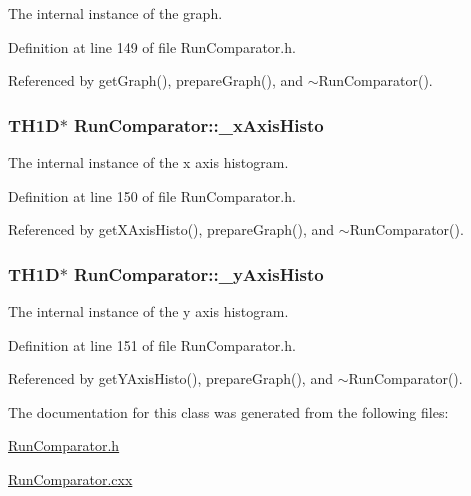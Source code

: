 The internal instance of the graph. 

Definition at line 149 of file RunComparator.h.

Referenced by getGraph(), prepareGraph(), and $\sim$RunComparator().\hypertarget{class_run_comparator_ab86d48424540d0f3f9abf52a2c11366b}{
\subsubsection[{\_\-xAxisHisto}]{\setlength{\rightskip}{0pt plus 5cm}TH1D$\ast$ {\bf RunComparator::\_\-xAxisHisto}}}
\label{class_run_comparator_ab86d48424540d0f3f9abf52a2c11366b}


The internal instance of the x axis histogram. 

Definition at line 150 of file RunComparator.h.

Referenced by getXAxisHisto(), prepareGraph(), and $\sim$RunComparator().\hypertarget{class_run_comparator_a05efdd671ec49502c946eb813e84ed62}{
\subsubsection[{\_\-yAxisHisto}]{\setlength{\rightskip}{0pt plus 5cm}TH1D$\ast$ {\bf RunComparator::\_\-yAxisHisto}}}
\label{class_run_comparator_a05efdd671ec49502c946eb813e84ed62}


The internal instance of the y axis histogram. 

Definition at line 151 of file RunComparator.h.

Referenced by getYAxisHisto(), prepareGraph(), and $\sim$RunComparator().

The documentation for this class was generated from the following files:\begin{DoxyCompactItemize}
\item 
\hyperlink{_run_comparator_8h}{RunComparator.h}\item 
\hyperlink{_run_comparator_8cxx}{RunComparator.cxx}\end{DoxyCompactItemize}
